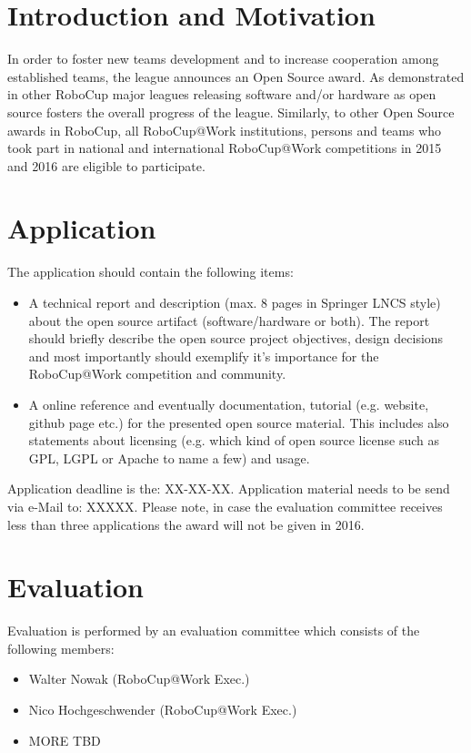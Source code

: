 \section{Introduction and Motivation}
In order to foster new teams development and to increase cooperation among established teams, the league announces an Open Source award. As demonstrated
in other RoboCup major leagues releasing software and/or hardware as open source fosters the overall progress of the league. Similarly, to other Open Source awards in RoboCup, all RoboCup@Work institutions, persons and teams who took part in national and international RoboCup@Work competitions in 2015 and 2016 are eligible to participate. 

\section{Application}
The application should contain the following items: 

\begin{itemize}
	\item A technical report and description (max. 8 pages in Springer LNCS style) about the open source artifact (software/hardware or both). The report should briefly describe the open source project objectives, design decisions and most importantly should exemplify it's importance for the RoboCup@Work competition and community.   
	\item A online reference and eventually documentation, tutorial (e.g. website, github page etc.) for the presented open source material. This includes also statements about licensing (e.g. which kind of open source license such as GPL, LGPL or Apache to name a few) and usage.  
\end{itemize}

Application deadline is the: XX-XX-XX. Application material needs to be send via e-Mail to: XXXXX. Please note, in case the evaluation committee receives less than three applications the award will not be given in 2016. 

\section{Evaluation}
Evaluation is performed by an evaluation committee which consists of the following members:

\begin{itemize}
	\item Walter Nowak (RoboCup@Work Exec.)
	\item Nico Hochgeschwender (RoboCup@Work Exec.)
	\item MORE TBD
\end{itemize}

